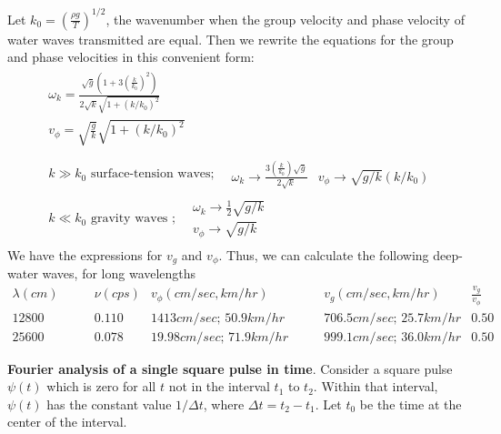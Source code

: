 \documentclass[twoside,10pt]{amsart}
\newcommand{\problemhead}[1]
  {\smallskip
   \noindent{\large\bf Problem #1.}
   \smallskip}
\begin{document}
Let $k_0 = \left( \frac{ \rho g }{ T } \right)^{1/2}$, the wavenumber when the group velocity and phase velocity of water waves transmitted are equal.  Then we rewrite the equations for the group and phase velocities in this convenient form:
\[
\begin{gathered}
  \begin{aligned}
    & \omega_k = \frac{ \sqrt{g} \left( 1 + 3 \left( \frac{k}{k_0} \right)^2 \right) }{ 2 \sqrt{k } \sqrt{ 1 + (k/k_0)^2 } } \\
    & v_{\phi} = \sqrt{ \frac{g}{k} } \sqrt{ 1 + (k/k_0)^2 } 
  \end{aligned} \\
  \begin{aligned}
    & k \gg k_0 \text{ surface-tension waves}; \begin{aligned} 
      & \omega_k \to \frac{ 3 \left( \frac{k}{k_0} \right) \sqrt{g} }{ 2 \sqrt{k} } 
      & v_{\phi} \to \sqrt{ g/k} (k/k_0 ) 
    \end{aligned} \\
    & k \ll k_0 \text{ gravity waves }; 
    \begin{aligned}
      & \omega_k \to \frac{1}{2} \sqrt{ g/ k } \\
      & v_{\phi} \to \sqrt{ g /k }
    \end{aligned}
  \end{aligned}
\end{gathered}
\]
We have the expressions for $v_g$ and $v_{\phi}$.  Thus, we can calculate the following deep-water waves, for long wavelengths
\[
\begin{aligned}
  \lambda (cm) & \quad \quad  \nu (cps) & v_{\phi} (cm/sec, km/hr) & \quad \quad  v_g (cm/sec, km/hr) & \frac{v_g}{v_{\phi}} \\
  12800 & \quad \quad 0.110 & 1413 cm/sec; \, 50.9 km/hr & \quad \quad 706.5 cm/sec; \, 25.7 km/hr & 0.50 \\
  25600 & \quad \quad 0.078 & 19.98 cm/sec; \, 71.9 km/hr & \quad \quad 999.1 cm/sec; \, 36.0 km/hr & 0.50 
\end{aligned}
\]

\problemhead{6.20} \textbf{ Fourier analysis of a single square pulse in time}.  Consider a square pulse $\psi(t)$ which is zero for all $t$ not in the interval $t_1$ to $t_2$.  Within that interval, $\psi(t)$ has the constant value $1/\Delta t$, where $\Delta t = t_2 - t_1$.  Let $t_0$ be the time at the center of the interval. 
\end{document}
